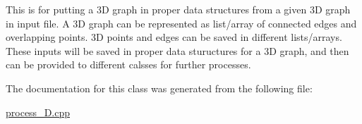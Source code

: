 This is for putting a 3D graph in proper data structures from a given 3D graph in input file. A 3D graph can be represented as list/array of connected edges and overlapping points. 3D points and edges can be saved in different lists/arrays. These inputs will be saved in proper data stuructures for a 3D graph, and then can be provided to different calsses for further processes.

The documentation for this class was generated from the following file\+:\begin{DoxyCompactItemize}
\item 
\hyperlink{process__3D_8cpp}{process\+\_\+D.\+cpp}\end{DoxyCompactItemize}
